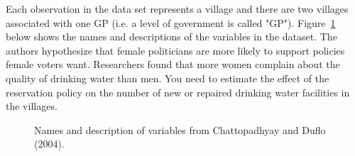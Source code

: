 \documentclass[12pt,letterpaper]{article}
\begin{document}
\noindent Each observation in the data set represents a village and there are two villages associated with one GP (i.e. a level of government is called "GP"). Figure~\ref{fig:women_desc} below shows the names and descriptions of the variables in the dataset. The authors hypothesize that female politicians are more likely to support policies female voters want. Researchers found that more women complain about the quality of drinking water than men. You need to estimate the effect of the reservation policy on the number of new or repaired drinking water facilities in the villages.
\vspace{.5cm}
\begin{figure}[h!]
	\caption{\footnotesize{Names and description of variables from Chattopadhyay and Duflo (2004).}}
	\vspace{.5cm}
	\centering
	\label{fig:women_desc}
\end{figure}		
\end{document}
